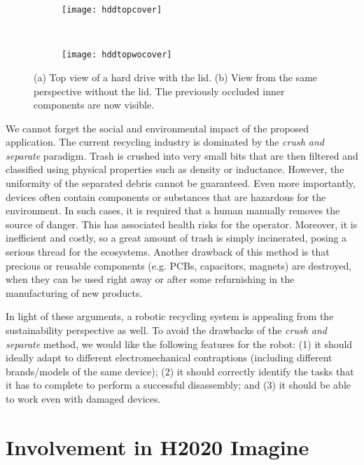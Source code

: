 \documentclass[../root.tex]{subfiles}
\begin{document}
\begin{figure}[tbhp]
	\centering
	\begin{subfigure}[b]{0.45\columnwidth}
		\texttt{[image: hddtopcover]}
		\caption{}
	\end{subfigure}
	~
	\begin{subfigure}[b]{0.45\columnwidth}
		\texttt{[image: hddtopwocover]}
		\caption{}
	\end{subfigure}
	\caption{
		(a) Top view of a hard drive with the lid.
		(b) View from the same perspective without the lid. The
		previously occluded inner components are now visible.
	}
	\label{fig:example-of-occlusion}
\end{figure}

We cannot forget the social and environmental impact of the
proposed application. The current recycling industry is dominated
by the \emph{crush and separate} paradigm. Trash is crushed into
very small bits that are then filtered and classified using
physical properties such as density or inductance. However,
the uniformity of the separated debris cannot be guaranteed.
Even more importantly, devices often contain components or
substances that are hazardous for the environment. In such cases,
it is required that a human manually removes the source of danger.
This has associated health risks for the operator. Moreover,
it is inefficient and costly, so a great amount of trash is
simply incinerated, posing a serious thread for the ecosystems.
Another drawback of this method is that precious or reusable
components (e.g. PCBs, capacitors, magnets) are destroyed,
when they can be used right away or after some refurnishing
in the manufacturing of new products.

In light of these arguments, a robotic recycling system is
appealing from the sustainability perspective as well.
To avoid the drawbacks of the \emph{crush and separate} method,
we would like the following features for the robot:
(1) it should
ideally adapt to different electromechanical contraptions
(including different brands/models of the same device);
(2) it should correctly identify the tasks that it
has to complete to perform a successful disassembly; and (3)
it should be able to work even with damaged devices.

\section{Involvement in H2020 Imagine}
\label{sec:imagine}
\end{document}
